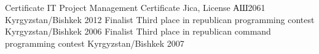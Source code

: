 \begin{cvhonors}
  \cvhonor
    {Certificate}
    {IT Project Management Certificate Jica, License АШ2061}
    {Kyrgyzstan/Bishkek}
    {2012}
  \cvhonor
    {Finalist}
    {Third place in republican programming contest}
    {Kyrgyzstan/Bishkek}
    {2006}
  \cvhonor
    {Finalist}
    {Third place in republican command programming contest}
    {Kyrgyzstan/Bishkek}
    {2007}
\end{cvhonors}
